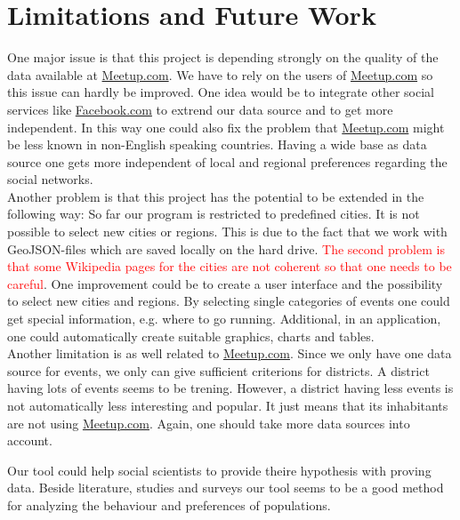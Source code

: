 \section{Limitations and Future Work}\label{sec:limitationsandfuturework}

One major issue is that this project is depending strongly on the quality of the data available at \url{Meetup.com}. We have to rely on the users of \url{Meetup.com} so this issue can hardly be improved. One idea would be to integrate other social services like \url{Facebook.com} to extrend our data source and to get more independent. In this way one could also fix the problem that \url{Meetup.com} might be less known in non-English speaking countries. Having a wide base as data source one gets more independent of local and regional preferences regarding the social networks.\\Another problem is that this project has the potential to be extended in the following way: So far our program is restricted to predefined cities. It is not possible to select new cities or regions. This is due to the fact that we work with GeoJSON-files which are saved locally on the hard drive. \textcolor{red}{The second problem is that some Wikipedia pages for the cities are not coherent so that one needs to be careful}. One improvement could be to create a user interface and the possibility to select new cities and regions. By selecting single categories of events one could get special information, e.g. where to go running. Additional, in an application, one could automatically create suitable graphics, charts and tables.\\Another limitation is as well related to \url{Meetup.com}. Since we only have one data source for events, we only can give sufficient criterions for districts. A district having lots of events seems to be trening. However, a district having less events is not automatically less interesting and popular. It just means that its inhabitants are not using \url{Meetup.com}. Again, one should take more data sources into account.

Our tool could help social scientists to provide theire hypothesis with proving data. Beside literature, studies and surveys our tool seems to be a good method for analyzing the behaviour and preferences of populations.